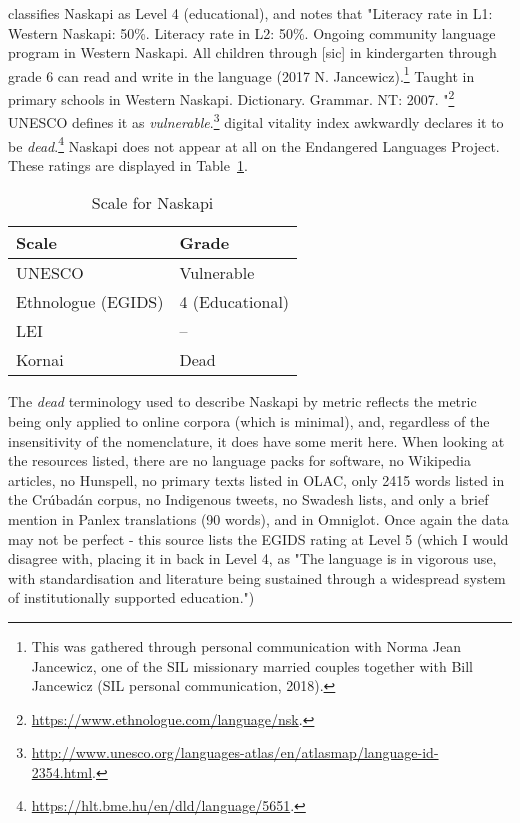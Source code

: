 \citet{lewis2009ethnologue} classifies Naskapi as Level 4 (educational), and notes that "Literacy rate in L1: Western Naskapi: 50\%. Literacy rate in L2: 50\%. Ongoing community language program in Western Naskapi. All children through [sic] in kindergarten through grade 6 can read and write in the language (2017 N. Jancewicz).\footnote{This was gathered through personal communication with Norma Jean Jancewicz, one of the SIL missionary married couples together with Bill Jancewicz (SIL personal communication, 2018).} Taught in primary schools in Western Naskapi. Dictionary. Grammar. NT: 2007. "\footnote{\href{https://www.ethnologue.com/language/nsk}{https://www.ethnologue.com/language/nsk}. } UNESCO defines it as {\it vulnerable}.\footnote{\href{http://www.unesco.org/languages-atlas/en/atlasmap/language-id-2354.html}{http://www.unesco.org/languages-atlas/en/atlasmap/language-id-2354.html}. }  digital vitality index awkwardly declares it to be {\it dead}.\footnote{\href{https://hlt.bme.hu/en/dld/language/5651}{https://hlt.bme.hu/en/dld/language/5651}. } Naskapi does not appear at all on the Endangered Languages Project. These ratings are displayed in Table~\ref{table:naskapi}.

\begin{table}
\centering
\begin{tabular}{|p{5cm}|p{5cm}|} \hline
{\bf Scale} & {\bf Grade} \\ \hline
UNESCO & Vulnerable \\ \hline
Ethnologue (EGIDS) & 4 (Educational) \\ \hline
LEI & -- \\ \hline
Kornai & Dead \\ \hline
\end{tabular}
\caption{Scale for Naskapi}
\label{table:naskapi}
\end{table}

The {\it dead} terminology used to describe Naskapi by  metric reflects the metric being only applied to online corpora (which is minimal), and, regardless of the insensitivity of the nomenclature, it does have some merit here. When looking at the resources listed, there are no language packs for software, no Wikipedia articles, no Hunspell, no primary texts listed in OLAC, only 2415 words listed in the Cr\'ubad\'an corpus, no Indigenous tweets, no Swadesh lists, and only a brief mention in Panlex translations (90 words), and in Omniglot. Once again the data may not be perfect - this source lists the EGIDS rating at Level 5 (which I would disagree with, placing it in back in Level 4, as "The language is in vigorous use, with standardisation and literature being sustained through a widespread system of institutionally supported education.")

